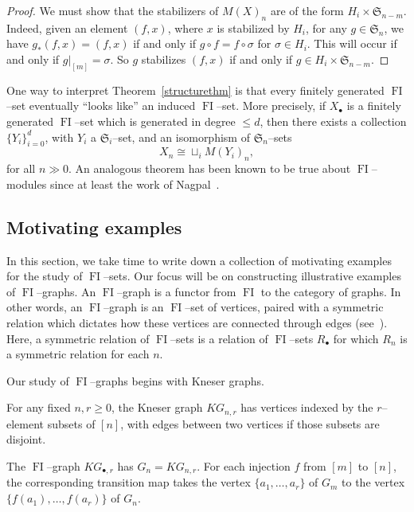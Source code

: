 \documentclass[ALCO,ThmDefs,Unicode,epreuves]{cedram}
\DeclareMathOperator{\FI}{FI}
\newcommand{\Sn}{\mathfrak{S}}
\newcommand{\dt}{\bullet}
\begin{document}
\begin{proof} 
We must show that the stabilizers of $M(X)_n$ are of the form $H_i \times \Sn_{n-m}$. Indeed, given an element $(f,x)$, where $x$ is stabilized by $H_i$, for any $g \in \Sn_n$, we have $g_{\ast}(f,x) = (f,x)$ if and only if $g \circ f = f \circ \sigma$ for $\sigma \in H_i$.
This will occur if and only if $g|_{[m]} = \sigma$. So $g$ stabilizes $(f,x)$ if and only if $g \in H_i \times \Sn_{n-m}$.
\end{proof}

One way to interpret Theorem~\ref{structurethm} is that every finitely generated $\FI$--set eventually ``looks like'' an induced $\FI$--set. More precisely, if $X_\dt$ is a finitely generated $\FI$--set which is generated in degree $\leq d$, then there exists a collection $\{Y_i\}_{i=0}^d$, with $Y_i$ a $\Sn_i$--set, and an isomorphism of $\Sn_n$--sets
\[
X_n \cong \sqcup_i M(Y_i)_n,
\]
for all $n \gg 0$. An analogous theorem has been known to be true about $\FI$--modules since at least the work of Nagpal~\cite{N}.

\subsection{Motivating examples} \label{examples}

In this section, we take time to write down a collection of motivating examples for the study of $\FI$--sets. Our focus will be on constructing illustrative examples of $\FI$--graphs. An $\FI$--graph is a functor from $\FI$ to the category of graphs. In other words, an $\FI$--graph is an $\FI$--set of vertices, paired with a symmetric relation which dictates how these vertices are connected through edges (see~\cite{RW}). Here, a symmetric relation of $\FI$--sets is a relation of $\FI$--sets $R_\dt$ for which $R_n$ is a symmetric relation for each $n$.

Our study of $\FI$--graphs begins with Kneser graphs.

\begin{example}\label{ex:kneser}
For any fixed $n,r \geq 0$, the Kneser graph $KG_{n,r}$ has vertices indexed by the $r$--element subsets of $[n]$, with edges between two vertices if those subsets are disjoint. 

The $\FI$--graph $KG_{\dt,r}$ has $G_n = KG_{n,r}$. For each injection $f$ from $[m]$ to $[n]$, the corresponding transition map takes the vertex $\{a_1,\dots,a_r\}$ of $G_m$ to the vertex $\{f(a_1),\dots,f(a_r)\}$ of $G_n$.
\end{example}
\end{document}
